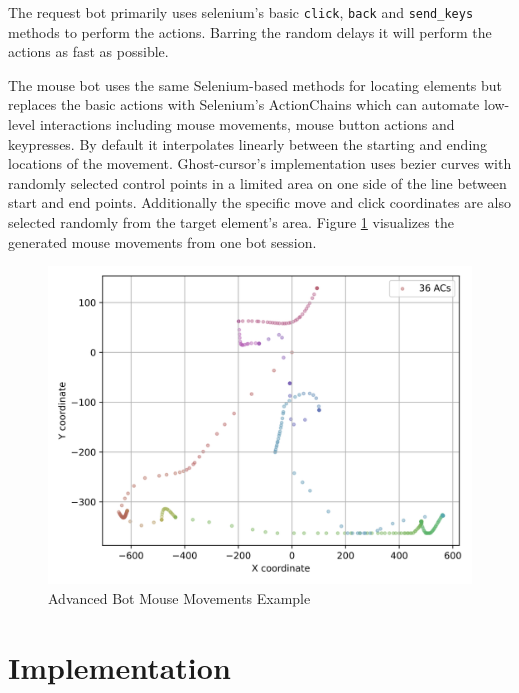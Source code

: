 \documentclass[
    fontsize=12pt,
    headings=small,
    parskip=half,           %
    bibliography=totoc,
    numbers=noenddot,       %
    open=any,               %
    final                   %
]{scrreprt}
\begin{document}
The request bot primarily uses selenium's basic \lstinline{click}, \lstinline{back} and \lstinline{send_keys} methods to perform the actions. Barring the random delays it will perform the actions as fast as possible.


The mouse bot uses the same Selenium-based methods for locating elements but replaces the basic actions with Selenium's ActionChains which can automate low-level interactions including mouse movements, mouse button actions and keypresses. By default it interpolates linearly between the starting and ending locations of the movement. Ghost-cursor's implementation uses bezier curves with randomly selected control points in a limited area on one side of the line between start and end points. Additionally the specific move and click coordinates are also selected randomly from the target element's area. Figure \ref{fig:bot_mouse_heatmap} visualizes the generated mouse movements from one bot session.


\begin{figure}[h]
	\includegraphics[width=\textwidth]{figures/bot_mouse_heatmap.png}
	\caption{Advanced Bot Mouse Movements Example}
	\label{fig:bot_mouse_heatmap}
\end{figure}



\section{Implementation}
\end{document}
